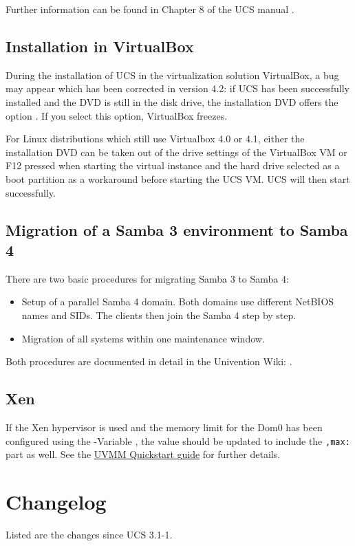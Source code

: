 Further information can be found in Chapter 8 of the UCS
manual \cite{UCS-Handbuch}.

\section{Installation in VirtualBox}
During the installation of UCS in the virtualization solution VirtualBox, a bug
may appear which has been corrected in version 4.2: if UCS has been
successfully installed and the DVD is still in the disk drive, the
installation DVD offers the option . If you select this option, VirtualBox freezes. 

For Linux distributions which still use Virtualbox 4.0 or 4.1, either
the installation DVD can be taken out of the drive settings of the
VirtualBox VM or F12 pressed when starting the virtual instance and
the hard drive selected as a boot partition as a workaround before
starting the UCS VM. UCS will then start successfully.

\section{Migration of a Samba 3 environment to Samba 4}
\label{samba-migration}

There are two basic procedures for migrating Samba 3 to Samba 4:

\begin{itemize}
\item Setup of a parallel Samba 4 domain. Both domains use different
NetBIOS names and SIDs. The clients then join the Samba 4 step by
step.
\item Migration of all systems within one maintenance window.
\end{itemize}

Both procedures are documented in detail in the Univention Wiki:
.

\section{Xen} %
If the Xen hypervisor is used and the memory limit for the Dom0 has been configured using the \ucsUCR{}-Variable , the value should be updated to include the \texttt{,max:} part as well.
See the \href{http://wiki.univention.de/index.php?title=UVMM_Quickstart-3.1/en#Configuring_the_Dom0}{UVMM Quickstart guide} for further details.

\chapter{Changelog}

Listed are the changes since UCS 3.1-1.






